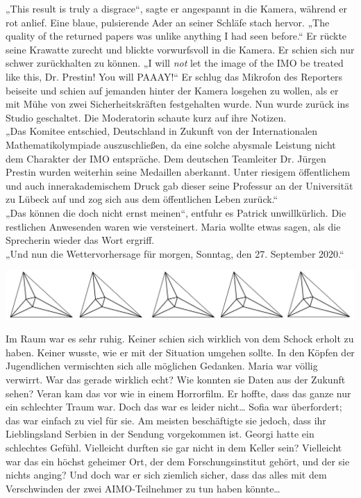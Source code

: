 \documentclass[oneside]{memoir}
\newcommand{\parasep}{
\bigskip
\bigskip
\begin{center} 
   \includegraphics[scale=.08]{parasep5.jpg} 
\end{center}
\bigskip
\bigskip
}
\begin{document}
„This result is truly a disgrace“, sagte er angespannt in die Kamera, während er rot anlief. Eine blaue, pulsierende Ader an seiner Schläfe stach hervor. „The quality of the returned papers was unlike anything I had seen before.“ Er rückte seine Krawatte zurecht und blickte vorwurfsvoll in die Kamera. Er schien sich nur schwer zurückhalten zu können. „I will \textit{not} let the image of the IMO be treated like this, Dr. Prestin! You will PAAAY!“ Er schlug das Mikrofon des Reporters beiseite und schien auf jemanden hinter der Kamera losgehen zu wollen, als er mit Mühe von zwei Sicherheitskräften festgehalten wurde. Nun wurde zurück ins Studio geschaltet. Die Moderatorin schaute kurz auf ihre Notizen. \\
„Das Komitee entschied, Deutschland in Zukunft von der Internationalen Mathematikolympiade auszuschließen, da eine solche abysmale Leistung nicht dem Charakter der IMO entspräche. Dem deutschen Teamleiter Dr. Jürgen Prestin wurden weiterhin seine Medaillen aberkannt. Unter riesigem öffentlichem und auch innerakademischem Druck gab dieser seine Professur an der Universität zu Lübeck auf und zog sich aus dem öffentlichen Leben zurück.“ \\
„Das können die doch nicht ernst meinen“, entfuhr es Patrick unwillkürlich. Die restlichen Anwesenden waren wie versteinert. Maria wollte etwas sagen, als die Sprecherin wieder das Wort ergriff. \\
„Und nun die Wettervorhersage für morgen, Sonntag, den 27. September 2020.“

     
     \parasep
     
Im Raum war es sehr ruhig. Keiner schien sich wirklich von dem Schock erholt zu haben. Keiner wusste, wie er mit der Situation umgehen sollte. 
In den Köpfen der Jugendlichen vermischten sich alle möglichen Gedanken.
Maria war völlig verwirrt. War das gerade wirklich echt? Wie konnten sie Daten aus der Zukunft sehen?
Veran kam das vor wie in einem Horrorfilm. Er hoffte, dass das ganze nur ein schlechter Traum war. Doch das war es leider nicht\ldots
Sofia war überfordert; das war einfach zu viel für sie. Am meisten beschäftigte sie jedoch, dass ihr Lieblingsland Serbien in der Sendung vorgekommen ist.
Georgi hatte ein schlechtes Gefühl. Vielleicht durften sie gar nicht in dem Keller sein? Vielleicht war das ein höchst geheimer Ort, der dem Forschungsinstitut gehört, und der sie nichts anging? Und doch war er sich ziemlich sicher, dass das alles mit dem Verschwinden der zwei AIMO-Teilnehmer zu tun haben könnte\ldots
\end{document}
